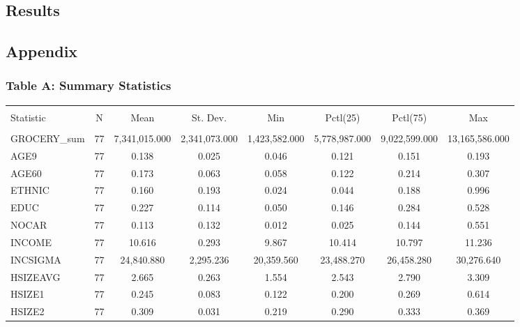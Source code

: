 \documentclass[
]{article}
\begin{document}
\hypertarget{results}{%
\subsection{Results}\label{results}}

\hypertarget{appendix}{%
\subsection{Appendix}\label{appendix}}

\hypertarget{table-a-summary-statistics}{%
\subsubsection{Table A: Summary
Statistics}\label{table-a-summary-statistics}}

\begin{table}[!htbp] \centering 
\tiny
\begin{tabular}{@{\extracolsep{5pt}}lccccccc} 
\\[-1.8ex]\hline 
\hline \\[-1.8ex] 
Statistic & \multicolumn{1}{c}{N} & \multicolumn{1}{c}{Mean} & \multicolumn{1}{c}{St. Dev.} & \multicolumn{1}{c}{Min} & \multicolumn{1}{c}{Pctl(25)} & \multicolumn{1}{c}{Pctl(75)} & \multicolumn{1}{c}{Max} \\ 
\hline \\[-1.8ex] 
GROCERY\_sum & 77 & 7,341,015.000 & 2,341,073.000 & 1,423,582.000 & 5,778,987.000 & 9,022,599.000 & 13,165,586.000 \\ 
AGE9 & 77 & 0.138 & 0.025 & 0.046 & 0.121 & 0.151 & 0.193 \\ 
AGE60 & 77 & 0.173 & 0.063 & 0.058 & 0.122 & 0.214 & 0.307 \\ 
ETHNIC & 77 & 0.160 & 0.193 & 0.024 & 0.044 & 0.188 & 0.996 \\ 
EDUC & 77 & 0.227 & 0.114 & 0.050 & 0.146 & 0.284 & 0.528 \\ 
NOCAR & 77 & 0.113 & 0.132 & 0.012 & 0.025 & 0.144 & 0.551 \\ 
INCOME & 77 & 10.616 & 0.293 & 9.867 & 10.414 & 10.797 & 11.236 \\ 
INCSIGMA & 77 & 24,840.880 & 2,295.236 & 20,359.560 & 23,488.270 & 26,458.280 & 30,276.640 \\ 
HSIZEAVG & 77 & 2.665 & 0.263 & 1.554 & 2.543 & 2.790 & 3.309 \\ 
HSIZE1 & 77 & 0.245 & 0.083 & 0.122 & 0.200 & 0.269 & 0.614 \\ 
HSIZE2 & 77 & 0.309 & 0.031 & 0.219 & 0.290 & 0.333 & 0.369 \\ 

\end{tabular}
\end{table}
\end{document}
